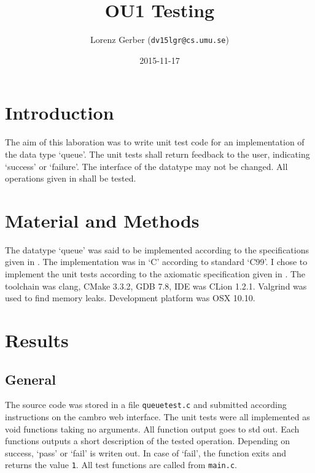 \documentclass[a4paper,11pt,twoside]{article}
\title{OU1 Testing}
\author{Lorenz Gerber  ({\tt{dv15lgr@cs.umu.se}})}
\date{2015-11-17}
\begin{document}
\maketitle

\tableofcontents
\newpage

\section{Introduction} 
The aim of this laboration was to write unit test code for an
implementation of the data type `queue'. The unit tests shall 
return feedback to the user, indicating `success' or `failure'. The
interface of the datatype may not be changed. All operations given in
\cite[p. 155]{janlert2000} shall be tested.

\section{Material and Methods} 
The datatype `queue' was said to be implemented according to the 
specifications given in \cite[pp.155 -- 172]{janlert2000}. The
implementation was in `C' according to standard `C99'. I chose to 
implement the unit tests according to the axiomatic specification 
given in \cite[pp.156 + 157]{janlert2000}. The toolchain was clang, 
CMake 3.3.2, GDB 7.8, IDE was CLion 1.2.1. Valgrind was used to 
find memory leaks. Development platform was OSX 10.10. 

\section{Results}
\subsection{General}
The source code was stored in a file \texttt{queuetest.c} and submitted
according instructions on the cambro web interface. The unit tests were
all implemented as void functions taking no arguments. All function
output goes to std out. Each functions outputs a short description of 
the tested operation. Depending on success, `pass' or `fail' is writen
out. In case of `fail', the function exits and returns the value
\texttt{1}. All test functions are called from \texttt{main.c}. 
\end{document}
